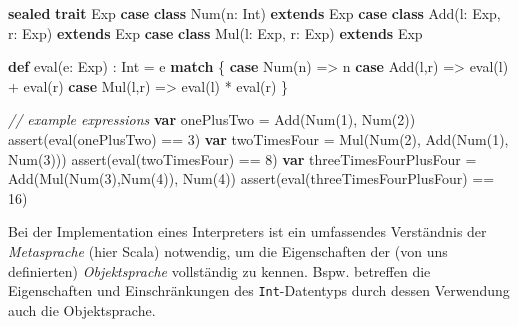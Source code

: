 \documentclass[]{article}
\newenvironment{Shaded}{}{}
\newcommand{\CommentTok}[1]{\textcolor[rgb]{0.38,0.63,0.69}{\textit{#1}}}
\newcommand{\DecValTok}[1]{\textcolor[rgb]{0.25,0.63,0.44}{#1}}
\newcommand{\FunctionTok}[1]{\textcolor[rgb]{0.02,0.16,0.49}{#1}}
\newcommand{\KeywordTok}[1]{\textcolor[rgb]{0.00,0.44,0.13}{\textbf{#1}}}
\newcommand{\NormalTok}[1]{#1}
\begin{document}
\begin{Shaded}
\begin{Highlighting}[]
\KeywordTok{sealed} \KeywordTok{trait}\NormalTok{ Exp}
\KeywordTok{case} \KeywordTok{class} \FunctionTok{Num}\NormalTok{(n: Int) }\KeywordTok{extends}\NormalTok{ Exp}
\KeywordTok{case} \KeywordTok{class} \FunctionTok{Add}\NormalTok{(l: Exp, r: Exp) }\KeywordTok{extends}\NormalTok{ Exp}
\KeywordTok{case} \KeywordTok{class} \FunctionTok{Mul}\NormalTok{(l: Exp, r: Exp) }\KeywordTok{extends}\NormalTok{ Exp}

\KeywordTok{def} \FunctionTok{eval}\NormalTok{(e: Exp) : Int = e }\KeywordTok{match}\NormalTok{ \{}
  \KeywordTok{case} \FunctionTok{Num}\NormalTok{(n) =\textgreater{} n}
  \KeywordTok{case} \FunctionTok{Add}\NormalTok{(l,r) =\textgreater{} }\FunctionTok{eval}\NormalTok{(l) + }\FunctionTok{eval}\NormalTok{(r)}
  \KeywordTok{case} \FunctionTok{Mul}\NormalTok{(l,r) =\textgreater{} }\FunctionTok{eval}\NormalTok{(l) * }\FunctionTok{eval}\NormalTok{(r)}
\NormalTok{\}}

\CommentTok{// example expressions}
\KeywordTok{var}\NormalTok{ onePlusTwo = }\FunctionTok{Add}\NormalTok{(}\FunctionTok{Num}\NormalTok{(}\DecValTok{1}\NormalTok{), }\FunctionTok{Num}\NormalTok{(}\DecValTok{2}\NormalTok{))}
\FunctionTok{assert}\NormalTok{(}\FunctionTok{eval}\NormalTok{(onePlusTwo) == }\DecValTok{3}\NormalTok{)}
\KeywordTok{var}\NormalTok{ twoTimesFour = }\FunctionTok{Mul}\NormalTok{(}\FunctionTok{Num}\NormalTok{(}\DecValTok{2}\NormalTok{), }\FunctionTok{Add}\NormalTok{(}\FunctionTok{Num}\NormalTok{(}\DecValTok{1}\NormalTok{), }\FunctionTok{Num}\NormalTok{(}\DecValTok{3}\NormalTok{)))}
\FunctionTok{assert}\NormalTok{(}\FunctionTok{eval}\NormalTok{(twoTimesFour) == }\DecValTok{8}\NormalTok{)}
\KeywordTok{var}\NormalTok{ threeTimesFourPlusFour = }\FunctionTok{Add}\NormalTok{(}\FunctionTok{Mul}\NormalTok{(}\FunctionTok{Num}\NormalTok{(}\DecValTok{3}\NormalTok{),}\FunctionTok{Num}\NormalTok{(}\DecValTok{4}\NormalTok{)), }\FunctionTok{Num}\NormalTok{(}\DecValTok{4}\NormalTok{))}
\FunctionTok{assert}\NormalTok{(}\FunctionTok{eval}\NormalTok{(threeTimesFourPlusFour) == }\DecValTok{16}\NormalTok{)}
\end{Highlighting}
\end{Shaded}

Bei der Implementation eines Interpreters ist ein umfassendes
Verständnis der \emph{Metasprache} (hier Scala) notwendig, um die
Eigenschaften der (von uns definierten) \emph{Objektsprache} vollständig
zu kennen. Bspw. betreffen die Eigenschaften und Einschränkungen des
\texttt{Int}-Datentyps durch dessen Verwendung auch die Objektsprache.
\end{document}
